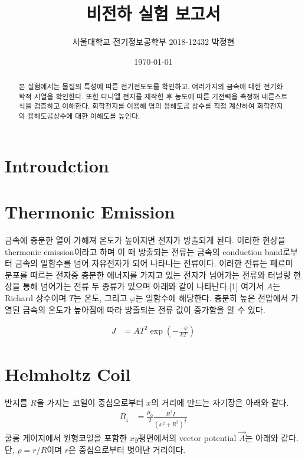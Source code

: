 \documentclass[%
 reprint,
 amsmath,amssymb,
 aps,
]{revtex4-2}
\begin{document}
\title{비전하 실험 보고서}

\author{서울대학교 전기정보공학부 2018-12432 박정현}
\date{\today}%

\begin{abstract}
본 실험에서는 물질의 특성에 따른 전기전도도를 확인하고, 여러가지의 금속에 대한 전기화학적 서열을 확인한다. 또한 다니엘 전지를 제작한 후 농도에 따른 기전력을 측정해 네른스트 식을 검증하고 이해한다. 화학전지를 이용해 염의 용해도곱 상수를 직접 계산하여 화학전지와 용해도곱상수에 대한 이해도를 높인다. 
\end{abstract}

\maketitle


\section{\label{sec:level1}Introudction}
\section{\label{sec:level2}Thermonic Emission}
금속에 충분한 열이 가해져 온도가 높아지면 전자가 방출되게 된다. 이러한 현상을 thermonic emission이라고 하며 이 때 방출되는 전류는 금속의 conduction band로부터 금속의 일함수를 넘어 자유전자가 되어 나타나는 전류이다. 이러한 전류는 페르미 분포를 따르는 전자중 충분한 에너지를 가지고 있는 전자가 넘어가는 전류와 터널링 현상을 통해 넘어가는 전류 두 종류가 있으며 아래와 같이 나타난다.[1] 여기서 $A$는 Richard 상수이며 $T$는 온도, 그리고 $\varphi$는 일함수에 해당한다. 충분히 높은 전압에서 가열된 금속의 온도가 높아짐에 따라 방출되는 전류 값이 증가함을 알 수 있다.

\begin{align}
	J &= AT^{2}\exp\left(-\frac{-\varphi}{kT}\right)
\end{align}

\section{\label{sec:level2}Helmholtz Coil}
반지름 $R$을 가지는 코일이 중심으로부터 $x$의 거리에 만드는 자기장은 아래와 같다.
\begin{align}
	B_{z} &= \frac{\mu_{0}}{2}\frac{R^{2}I}{\left(x^{2} + R^{2}\right)^{\frac{3}{2}}}
\end{align}
쿨롱 게이지에서 원형코일을 포함한 $xy$평면에서의 vector potential $\vec{A}$는 아래와 같다. 단, $\rho = r/R$이며 $r$은 중심으로부터 벗어난 거리이다.
\end{document}
